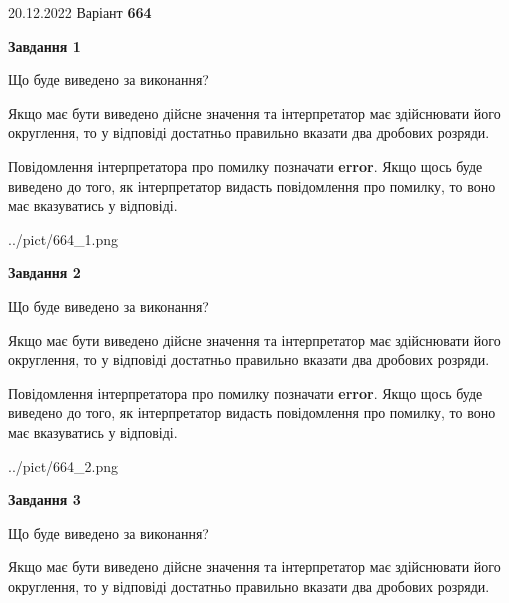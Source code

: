 \documentclass[12pt, ukrainian]{article}
\begin{document}
{20.12.2022 Варіант \No \textbf { 664 }\par}
{
\begin {Large}

{\begin {center}\textbf{Завдання 1}\end {center}}\par
Що буде виведено за виконання? \par

Якщо має бути виведено дійсне значення та інтерпретатор має здійснювати його округлення, 
то у відповіді достатньо правильно вказати два дробових розряди.

Повідомлення інтерпретатора про помилку позначати \textbf{error}.
Якщо щось буде виведено до того, як інтерпретатор видасть повідомлення про помилку, 
то воно має вказуватись у відповіді. \par

\begin{center}
	{../pict/664_1.png}
\end{center}
\newpage

{\begin {center}\textbf{Завдання 2}\end {center}}\par
Що буде виведено за виконання? \par

Якщо має бути виведено дійсне значення та інтерпретатор має здійснювати його округлення, 
то у відповіді достатньо правильно вказати два дробових розряди.

Повідомлення інтерпретатора про помилку позначати \textbf{error}.
Якщо щось буде виведено до того, як інтерпретатор видасть повідомлення про помилку, 
то воно має вказуватись у відповіді. \par

\begin{center}
	{../pict/664_2.png}
\end{center}
\newpage

{\begin {center}\textbf{Завдання 3}\end {center}}\par
Що буде виведено за виконання? \par

Якщо має бути виведено дійсне значення та інтерпретатор має здійснювати його округлення, 
то у відповіді достатньо правильно вказати два дробових розряди.


\end{Large}}
\end{document}
